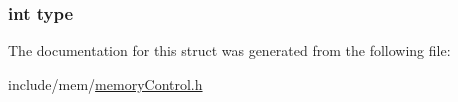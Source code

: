 \subsubsection[{\texorpdfstring{type}{type}}]{\setlength{\rightskip}{0pt plus 5cm}int type}\hypertarget{structcmcb_ac765329451135abec74c45e1897abf26}{}\label{structcmcb_ac765329451135abec74c45e1897abf26}


The documentation for this struct was generated from the following file\+:\begin{DoxyCompactItemize}
\item 
include/mem/\hyperlink{memory_control_8h}{memory\+Control.\+h}\end{DoxyCompactItemize}

